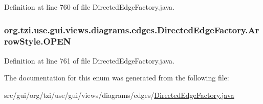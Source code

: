 Definition at line 760 of file Directed\-Edge\-Factory.\-java.

\hypertarget{enumorg_1_1tzi_1_1use_1_1gui_1_1views_1_1diagrams_1_1edges_1_1_directed_edge_factory_1_1_arrow_style_a71eedeacc618ab89e7567623973c653b}{
\subsubsection[{O\-P\-E\-N}]{\setlength{\rightskip}{0pt plus 5cm}org.\-tzi.\-use.\-gui.\-views.\-diagrams.\-edges.\-Directed\-Edge\-Factory.\-Arrow\-Style.\-O\-P\-E\-N}}\label{enumorg_1_1tzi_1_1use_1_1gui_1_1views_1_1diagrams_1_1edges_1_1_directed_edge_factory_1_1_arrow_style_a71eedeacc618ab89e7567623973c653b}


Definition at line 761 of file Directed\-Edge\-Factory.\-java.



The documentation for this enum was generated from the following file\-:\begin{DoxyCompactItemize}
\item 
src/gui/org/tzi/use/gui/views/diagrams/edges/\hyperlink{_directed_edge_factory_8java}{Directed\-Edge\-Factory.\-java}\end{DoxyCompactItemize}
